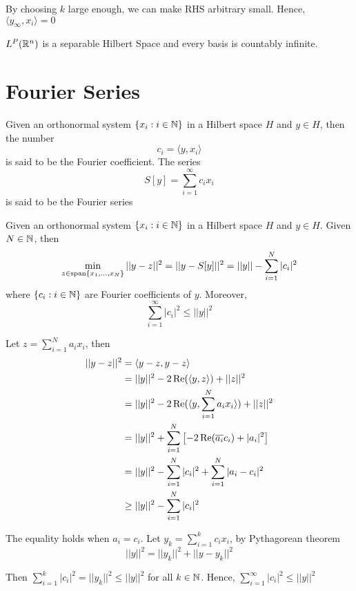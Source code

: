 \documentclass{report}
\begin{document}
By choosing $k$ large enough, we can make RHS arbitrary small. Hence, $\langle y_\infty, x_i \rangle = 0$

\begin{theorem}
    $L^P(\mathbb{R}^n)$ is a separable Hilbert Space and every basis is countably infinite.
\end{theorem}

\section{Fourier Series}

\begin{definition}
    Given an orthonormal system $\{x_i: i \in \mathbb{N} \}$ in a Hilbert space $H$ and $y \in H$, then the number
    \[
        c_i = \langle y, x_i\rangle
    \]
    is said to be the Fourier coefficient. The series
    \[
        S[y] = \sum_{i=1}^\infty c_i x_i
    \]
    is said to be the Fourier series
\end{definition}

\begin{theorem}
    Given an orthonormal system $\{x_i: i \in \mathbb{N} \}$ in a Hilbert space $H$ and $y \in H$. Given $N \in \mathbb{N}$, then 
    \[
        \min_{z \in \operatorname{span}\{x_1, ..., x_N \}} ||y - z||^2 = ||y - S[y]||^2 = ||y|| - \sum_{i=1}^N |c_i|^2
    \]
    where $\{c_i: i \in \mathbb{N} \}$ are Fourier coefficients of $y$. Moreover, 
    \[
        \sum_{i=1}^\infty |c_i|^2 \leq ||y||^2
    \]
\end{theorem}

Let $z = \sum_{i=1}^N a_i x_i$, then 
\begin{align*}
    ||y - z||^2
    &= \langle y - z, y - z\rangle \\
    &= ||y||^2 - 2 \operatorname{Re}(\langle y, z\rangle) + ||z||^2 \\
    &= ||y||^2 - 2 \operatorname{Re}(\langle y, \sum_{i=1}^N a_i x_i\rangle) + ||z||^2 \\
    &= ||y||^2 + \sum_{i=1}^N \left[ - 2\operatorname{Re}(\overline{a_i} c_i) + |a_i|^2 \right] \\ 
    &= ||y||^2 - \sum_{i=1}^N |c_i|^2 + \sum_{i=1}^N |a_i - c_i|^2 \\
    &\geq ||y||^2 - \sum_{i=1}^N |c_i|^2
\end{align*}

The equality holds when $a_i = c_i$. Let $y_k = \sum_{i=1}^k c_i x_i$, by Pythagorean theorem
\[
    ||y||^2 = ||y_k||^2 + ||y - y_k||^2
\]

Then $\sum_{i=1}^k |c_i|^2 = ||y_k||^2 \leq ||y||^2$ for all $k \in \mathbb{N}$. Hence, $\sum_{i=1}^\infty |c_i|^2 \leq ||y||^2$
\end{document}

